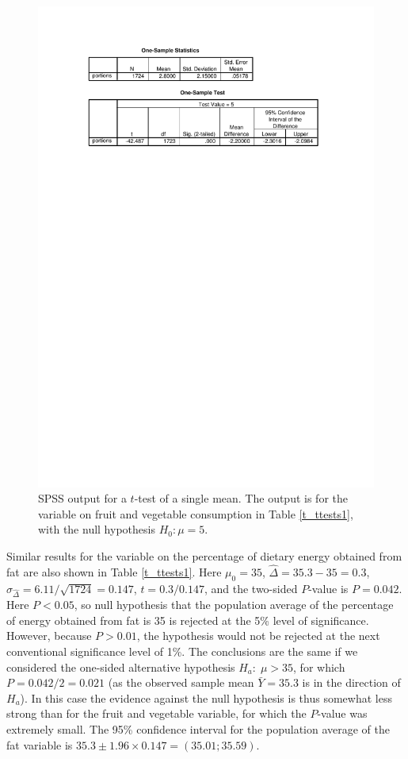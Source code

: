 \begin{figure}
\caption{SPSS output for a $t$-test of a single mean. The output is for
the variable on fruit and vegetable consumption in Table
\ref{t_ttests1}, with the null hypothesis $H_{0}: \mu=5$.}
\label{f_spsstest}

\includegraphics[bb=100 580 500 780, width=130mm]{ttestspss}
\end{figure}

Similar results for the variable on the percentage of dietary energy
obtained from fat are also shown in Table \ref{t_ttests1}. Here
$\mu_{0}=35$, $\hat{\Delta}=35.3-35=0.3$,
$\hat{\sigma}_{\hat{\Delta}}=6.11/\sqrt{1724}=0.147$, $t=0.3/0.147$, and
the two-sided $P$-value is $P=0.042$. Here $P<0.05$, so null hypothesis
that the population average of the percentage of energy obtained from
fat is 35 is rejected at the 5\% level of significance. However, because
$P>0.01$, the hypothesis would not be rejected at the next conventional
significance level of 1\%. The conclusions are the same if we considered
the one-sided alternative hypothesis $H_{a}:\; \mu>35$, for which
$P=0.042/2=0.021$ (as the observed sample mean $\bar{Y}=35.3$ is in the
direction of $H_{a}$). In this case the evidence against the null
hypothesis is thus somewhat less strong than for the fruit and vegetable
variable, for which the $P$-value was extremely small. The 95\%
confidence interval for the population average of the fat variable is
$35.3\pm 1.96\times 0.147=(35.01; 35.59)$.

